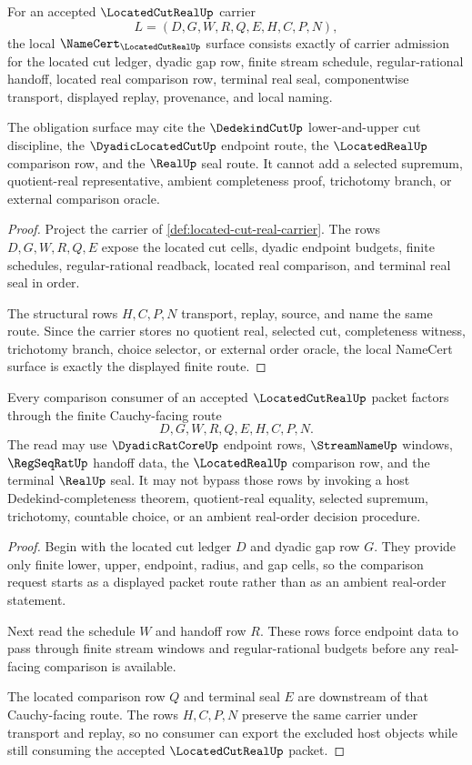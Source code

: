 \begin{theorem}
\label{thm:located-cut-real-namecert-obligations}
For an accepted $\LocatedCutRealUp$ carrier
$$
L=(D,G,W,R,Q,E,H,C,P,N),
$$
the local $\NameCert_{\LocatedCutRealUp}$ surface consists exactly of carrier admission for the located cut ledger, dyadic gap row, finite stream schedule, regular-rational handoff, located real comparison row, terminal real seal, componentwise transport, displayed replay, provenance, and local naming.

The obligation surface may cite the $\DedekindCutUp$ lower-and-upper cut discipline, the $\DyadicLocatedCutUp$ endpoint route, the $\LocatedRealUp$ comparison row, and the $\RealUp$ seal route. It cannot add a selected supremum, quotient-real representative, ambient completeness proof, trichotomy branch, or external comparison oracle.
\end{theorem}
\begin{proof}
Project the carrier of \autoref{def:located-cut-real-carrier}. The rows $D,G,W,R,Q,E$ expose the located cut cells, dyadic endpoint budgets, finite schedules, regular-rational readback, located real comparison, and terminal real seal in order.

The structural rows $H,C,P,N$ transport, replay, source, and name the same route. Since the carrier stores no quotient real, selected cut, completeness witness, trichotomy branch, choice selector, or external order oracle, the local NameCert surface is exactly the displayed finite route.
\end{proof}

\begin{theorem}
\label{thm:located-cut-real-cauchy-comparison}
Every comparison consumer of an accepted $\LocatedCutRealUp$ packet factors through the finite Cauchy-facing route
$$
D,G,W,R,Q,E,H,C,P,N .
$$
The read may use $\DyadicRatCoreUp$ endpoint rows, $\StreamNameUp$ windows, $\RegSeqRatUp$ handoff data, the $\LocatedRealUp$ comparison row, and the terminal $\RealUp$ seal. It may not bypass those rows by invoking a host Dedekind-completeness theorem, quotient-real equality, selected supremum, trichotomy, countable choice, or an ambient real-order decision procedure.
\end{theorem}
\begin{proof}
Begin with the located cut ledger $D$ and dyadic gap row $G$. They provide only finite lower, upper, endpoint, radius, and gap cells, so the comparison request starts as a displayed packet route rather than as an ambient real-order statement.

Next read the schedule $W$ and handoff row $R$. These rows force endpoint data to pass through finite stream windows and regular-rational budgets before any real-facing comparison is available.

The located comparison row $Q$ and terminal seal $E$ are downstream of that Cauchy-facing route. The rows $H,C,P,N$ preserve the same carrier under transport and replay, so no consumer can export the excluded host objects while still consuming the accepted $\LocatedCutRealUp$ packet.
\end{proof}

